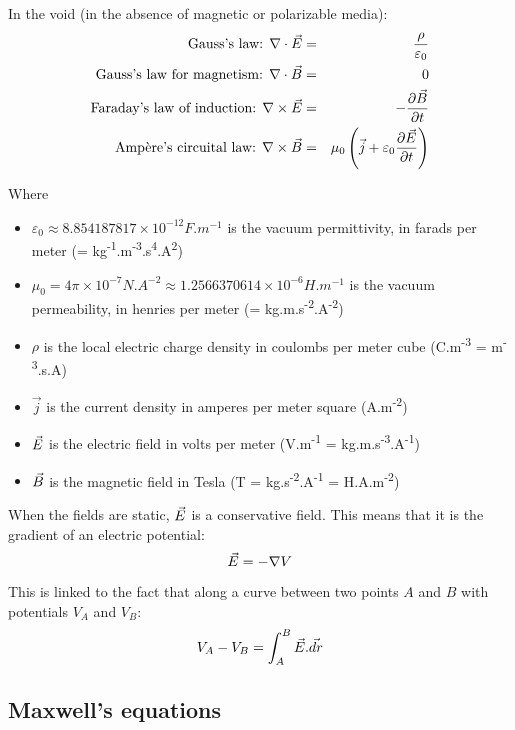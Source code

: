 \documentclass[a4paper,10pt]{article}
\newcommand{\vE}{\ensuremath\vec{E}} %
\newcommand{\vB}{\ensuremath\vec{B}} %
\newcommand{\pderiv}[2]{\ensuremath\frac{\partial #2}{\partial #1}}
\newcommand{\pdt}[1]{\ensuremath\pderiv{t}{#1}}
\begin{document}
In the void (in the absence of magnetic or polarizable media):
\begin{eqnarray}
  \text{Gauss's law: } \nabla \cdot \vE &=& \frac {\rho} {\varepsilon_0} \\
  \text{Gauss's law for magnetism: } \nabla \cdot \vB &=& 0 \\
  \text{Faraday's law of induction: } \nabla \times \vE &=& -\pdt{\vB} \\
  \text{Ampère's circuital law: } \nabla \times \vB &=& \mu_0\left(\vec{j} + \varepsilon_0 \pdt{\vE}\right)
\end{eqnarray}

Where
\begin{itemize}
  \item $\varepsilon_0 \approx 8.854187817 \times 10^{-12} F.m^{-1}$ is the vacuum permittivity, in farads per meter (= kg\textsuperscript{-1}.m\textsuperscript{-3}.s\textsuperscript{4}.A\textsuperscript{2})
  \item $\mu_0 = 4\pi \times 10^{−7} N.A^{-2} \approx 1.2566370614 \times 10^{-6} H.m^{-1}$ is the vacuum permeability, in henries per meter (= kg.m.s\textsuperscript{-2}.A\textsuperscript{-2})
  \item $\rho$ is the local electric charge density in coulombs per meter cube (C.m\textsuperscript{-3} = m\textsuperscript{-3}.s.A)
  \item $\vec{j}$ is the current density in amperes per meter square (A.m\textsuperscript{-2})
  \item $\vE$ is the electric field in volts per meter (V.m\textsuperscript{-1} = kg.m.s\textsuperscript{-3}.A\textsuperscript{-1})
  \item $\vB$ is the magnetic field in Tesla (T = kg.s\textsuperscript{-2}.A\textsuperscript{-1} = H.A.m\textsuperscript{-2})
\end{itemize}

When the fields are static, $\vE$ is a conservative field. This means that it is the gradient of an electric potential:
\begin{equation}
  \vE = -\nabla V
\end{equation}

This is linked to the fact that along a curve between two points $A$ and $B$ with potentials $V_A$ and $V_B$:
\begin{equation}
  V_A - V_B = \int_A^B \vE.\vec{dr}
\end{equation}

\subsection{Maxwell's equations}
\end{document}
